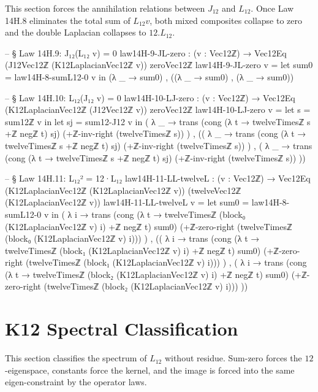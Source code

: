 \documentclass[11pt,a4paper]{book}
\def\cdot{.}%
\def\texorpdfstring#1#2{#2}%
\begin{document}
This section forces the annihilation relations between $J_{12}$ and $L_{12}$.
Once Law 14H.8 eliminates the total sum of $L_{12} v$, both mixed composites
collapse to zero and the double Laplacian collapses to $12 \cdot L_{12}$.

\begin{code}
  -- § Law 14H.9: J₁₂(L₁₂ v) = 0
  law14H-9-JL-zero : (v : Vec12ℤ) → Vec12Eq (J12Vec12ℤ (K12LaplacianVec12ℤ v)) zeroVec12ℤ
  law14H-9-JL-zero v =
    let sum0 = law14H-8-sumL12-0 v in
    (λ _ → sum0) ,
    ((λ _ → sum0) ,
     (λ _ → sum0))

  -- § Law 14H.10: L₁₂(J₁₂ v) = 0
  law14H-10-LJ-zero : (v : Vec12ℤ) → Vec12Eq (K12LaplacianVec12ℤ (J12Vec12ℤ v)) zeroVec12ℤ
  law14H-10-LJ-zero v =
    let s = sum12ℤ v in
    let sj = sum12-J12 v in
    ( λ _ →
        trans
          (cong (λ t → twelveTimesℤ s +ℤ negℤ t) sj)
          (+ℤ-inv-right (twelveTimesℤ s))
    ) ,
    (( λ _ →
          trans
            (cong (λ t → twelveTimesℤ s +ℤ negℤ t) sj)
            (+ℤ-inv-right (twelveTimesℤ s))
      ) ,
     ( λ _ →
          trans
            (cong (λ t → twelveTimesℤ s +ℤ negℤ t) sj)
            (+ℤ-inv-right (twelveTimesℤ s))
      ))

  -- § Law 14H.11: L₁₂² = 12·L₁₂
  law14H-11-LL-twelveL : (v : Vec12ℤ) → Vec12Eq (K12LaplacianVec12ℤ (K12LaplacianVec12ℤ v)) (twelveVec12ℤ (K12LaplacianVec12ℤ v))
  law14H-11-LL-twelveL v =
    let sum0 = law14H-8-sumL12-0 v in
    ( λ i →
        trans
          (cong (λ t → twelveTimesℤ (block₀ (K12LaplacianVec12ℤ v) i) +ℤ negℤ t) sum0)
          (+ℤ-zero-right (twelveTimesℤ (block₀ (K12LaplacianVec12ℤ v) i)))
    ) ,
    (( λ i →
          trans
            (cong (λ t → twelveTimesℤ (block₁ (K12LaplacianVec12ℤ v) i) +ℤ negℤ t) sum0)
            (+ℤ-zero-right (twelveTimesℤ (block₁ (K12LaplacianVec12ℤ v) i)))
      ) ,
     ( λ i →
          trans
            (cong (λ t → twelveTimesℤ (block₂ (K12LaplacianVec12ℤ v) i) +ℤ negℤ t) sum0)
            (+ℤ-zero-right (twelveTimesℤ (block₂ (K12LaplacianVec12ℤ v) i)))
      ))
\end{code}

\section{K\texorpdfstring{$_{12}$}{12} Spectral Classification}

This section classifies the spectrum of $L_{12}$ without residue.
Sum-zero forces the $12$-eigenspace, constants force the kernel, and the image
is forced into the same eigen-constraint by the operator laws.
\end{document}
